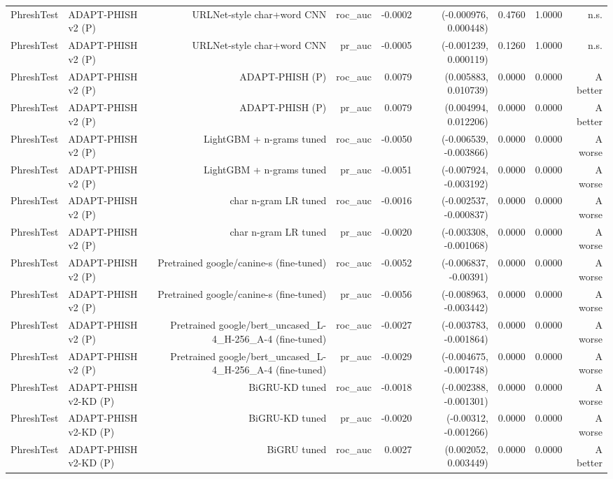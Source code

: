 \begin{table}[t]
\begin{tabular}{llrrrrrrr}
PhreshTest & ADAPT-PHISH v2 (P) & URLNet-style char+word CNN & roc\_auc & -0.0002 & (-0.000976, 0.000448) & 0.4760 & 1.0000 & n.s. \\
PhreshTest & ADAPT-PHISH v2 (P) & URLNet-style char+word CNN & pr\_auc & -0.0005 & (-0.001239, 0.000119) & 0.1260 & 1.0000 & n.s. \\
PhreshTest & ADAPT-PHISH v2 (P) & ADAPT-PHISH (P) & roc\_auc & 0.0079 & (0.005883, 0.010739) & 0.0000 & 0.0000 & A better \\
PhreshTest & ADAPT-PHISH v2 (P) & ADAPT-PHISH (P) & pr\_auc & 0.0079 & (0.004994, 0.012206) & 0.0000 & 0.0000 & A better \\
PhreshTest & ADAPT-PHISH v2 (P) & LightGBM + n-grams tuned & roc\_auc & -0.0050 & (-0.006539, -0.003866) & 0.0000 & 0.0000 & A worse \\
PhreshTest & ADAPT-PHISH v2 (P) & LightGBM + n-grams tuned & pr\_auc & -0.0051 & (-0.007924, -0.003192) & 0.0000 & 0.0000 & A worse \\
PhreshTest & ADAPT-PHISH v2 (P) & char n-gram LR tuned & roc\_auc & -0.0016 & (-0.002537, -0.000837) & 0.0000 & 0.0000 & A worse \\
PhreshTest & ADAPT-PHISH v2 (P) & char n-gram LR tuned & pr\_auc & -0.0020 & (-0.003308, -0.001068) & 0.0000 & 0.0000 & A worse \\
PhreshTest & ADAPT-PHISH v2 (P) & Pretrained google/canine-s (fine-tuned) & roc\_auc & -0.0052 & (-0.006837, -0.00391) & 0.0000 & 0.0000 & A worse \\
PhreshTest & ADAPT-PHISH v2 (P) & Pretrained google/canine-s (fine-tuned) & pr\_auc & -0.0056 & (-0.008963, -0.003442) & 0.0000 & 0.0000 & A worse \\
PhreshTest & ADAPT-PHISH v2 (P) & Pretrained google/bert\_uncased\_L-4\_H-256\_A-4 (fine-tuned) & roc\_auc & -0.0027 & (-0.003783, -0.001864) & 0.0000 & 0.0000 & A worse \\
PhreshTest & ADAPT-PHISH v2 (P) & Pretrained google/bert\_uncased\_L-4\_H-256\_A-4 (fine-tuned) & pr\_auc & -0.0029 & (-0.004675, -0.001748) & 0.0000 & 0.0000 & A worse \\
PhreshTest & ADAPT-PHISH v2-KD (P) & BiGRU-KD tuned & roc\_auc & -0.0018 & (-0.002388, -0.001301) & 0.0000 & 0.0000 & A worse \\
PhreshTest & ADAPT-PHISH v2-KD (P) & BiGRU-KD tuned & pr\_auc & -0.0020 & (-0.00312, -0.001266) & 0.0000 & 0.0000 & A worse \\
PhreshTest & ADAPT-PHISH v2-KD (P) & BiGRU tuned & roc\_auc & 0.0027 & (0.002052, 0.003449) & 0.0000 & 0.0000 & A better \\

\end{tabular}
\end{table}
